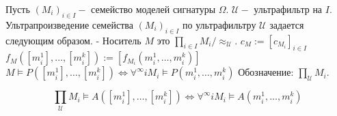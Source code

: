 \begin{defn}
Пусть $\left(M_{i}\right)_{i \in I}-$ семейство моделей сигнатуры $\Omega .$ $\mathcal{U}-$ ультрафильтр на $I .$ Ультрапроизведение семейства $\left(M_{i}\right)_{i \in I}$ по ультрафильтру $\mathcal{U}$ задается следующим образом.
- Носитель $M$ это $\prod_{i \in I} M_{i} / \approx_{\mathcal{U}} .$
$c_{M}:=\left[c_{M_{i}}\right]_{i \in I}$
$f_{M}\left(\left[m_{i}^{1}\right], \ldots,\left[m_{i}^{k}\right]\right):=\left[f_{M_{i}}\left(m_{i}^{1}, \ldots, m_{i}^{k}\right)\right]$
$M \vDash P\left(\left[m_{i}^{1}\right], \ldots,\left[m_{i}^{k}\right]\right) \Leftrightarrow \forall^{\infty} i M_{i} \vDash P\left(m_{i}^{1}, \ldots, m_{i}^{k}\right)$
Обозначение: $\prod_{\mathcal{U}} M_{i} .$
\end{defn}
\begin{theo}[Лось]
$$
\prod_{\mathcal{U}} M_{i} \vDash A\left(\left[m_{i}^{1}\right], \ldots,\left[m_{i}^{k}\right]\right) \Leftrightarrow \forall^{\infty} i M_{i} \vDash A\left(m_{i}^{1}, \ldots, m_{i}^{k}\right)
$$
\end{theo}